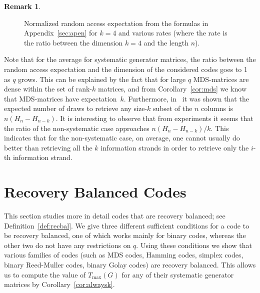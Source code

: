 \documentclass[11pt,a4paper,reqno,twoside]{amsart}
\theoremstyle{definition}
\newtheorem{remark}{Remark}
\newcommand{\tmax}{T_{\max}}
\begin{document}
\begin{remark}
\begin{figure}[ht!]
\caption{\label{fig:averages} Normalized random access expectation from the formulas in Appendix~\ref{sec:apen} for $k=4$ and various rates (where the rate is the ratio between the dimension $k=4$ and the length $n$).}
\end{figure}
Note that for the average for systematic generator matrices, the ratio between the random access expectation and the dimension of the considered codes goes to 1 as $q$ grows. This can be explained by the fact that for large $q$ MDS-matrices are dense within the set of rank-$k$ matrices, and from Corollary~\ref{cor:mds} we know that MDS-matrices have expectation~$k$. Furthermore, in~\cite{flajolet1992birthday} it was shown that the expected number of draws to retrieve any size-$k$ subset of the $n$ columns is $n(H_n-H_{n-k})$. It is interesting to observe that from experiments it seems that the ratio of the non-systematic case approaches ${n(H_n-H_{n-k})}/{k}$. This indicates that for the non-systematic case, on average, one cannot usually do better than retrieving all the $k$ information strands in order to retrieve only the $i$-th information strand.
\end{remark}


\section{Recovery Balanced Codes}\label{sec:rec_bal}
This section studies more in detail codes that are recovery balanced; see Definition~\ref{def:recbal}. We give three different sufficient conditions for a code to be recovery balanced, one of which works mainly for binary codes, whereas the other two do not have any restrictions on $q$.
Using these conditions we show that various families of codes (such as MDS codes, Hamming codes, simplex codes, binary Reed-Muller codes, binary Golay codes) are recovery balanced. This allows us to compute the value of
$\tmax(G)$ for any of their systematic generator matrices by Corollary~\ref{cor:alwaysk}.
\end{document}
